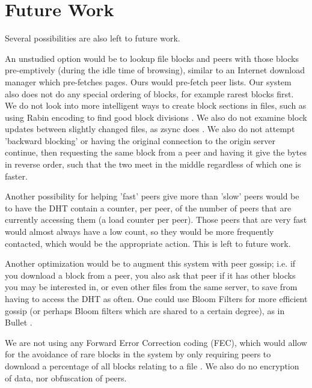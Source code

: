 \section{Future Work}
Several possibilities are also left to future work.

An unstudied option would be to lookup file blocks and peers with those blocks pre-emptively (during the idle time of browsing), similar to an Internet download manager which pre-fetches pages.  Ours would pre-fetch peer lists.  %
Our system also does not do any special ordering of blocks, for example rarest blocks first.  %
We do not look into more intelligent ways to create block sections in files, such as using Rabin encoding to find good block divisions \cite{Rabin} \cite{shark}.  We also do not examine block updates between slightly changed files, as zsync does \cite{zsync}.
We also do not attempt 'backward blocking' or having the original connection to the origin server continue, then requesting the same block from a peer and having it give the bytes in reverse order, such that the two meet in the middle regardless of which one is faster.

Another possibility for helping 'fast' peers give more than 'slow' peers would be to have the DHT contain a counter, per peer, of the number of peers that are currently accessing them (a load counter per peer).  Those peers that are very fast would almost always have a low count, so they would be more frequently contacted, which would be the appropriate action.  This is left to future work.

Another optimization would be to augment this system with peer gossip; i.e. if you download a block from a peer, you also ask that peer if it has other blocks you may be interested in, or even other files from the same server, to save from having to access the DHT as often.  One could use Bloom Filters for more efficient gossip (or perhaps Bloom filters which are shared to a certain degree), as in Bullet \cite{bullet}.

We are not using any Forward Error Correction coding (FEC), which would allow for the avoidance of rare blocks in the system by only requiring peers to download a percentage of all blocks relating to a file \cite{avalanche}.  We also do no encryption of data, nor obfuscation of peers.

